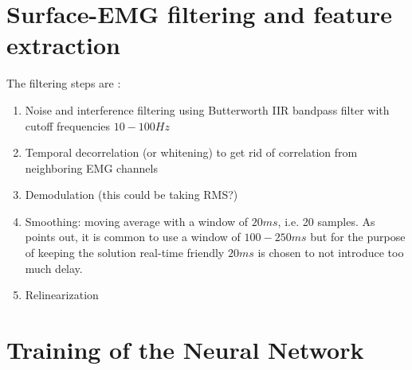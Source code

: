 \documentclass[../main.tex]{subfiles}
\begin{document}
\section{Surface-EMG filtering and feature extraction}
The filtering steps are \parencite[99]{Clancy2016}:
\begin{enumerate}
    \item Noise and interference filtering using Butterworth IIR bandpass filter with cutoff frequencies $10-100Hz$
    \item Temporal decorrelation (or whitening) to get rid of correlation from neighboring EMG channels
    \item Demodulation (this could be taking RMS?)
    \item Smoothing: moving average with a window of $20ms$, i.e. 20 samples. As \citeauthor{Clancy2016} points out, it is common to use a window of $100-250 ms$ but for the purpose of keeping the solution real-time friendly $20ms$ is chosen to not introduce too much delay.
    \item Relinearization
\end{enumerate}

\section{Training of the Neural Network}
\end{document}
